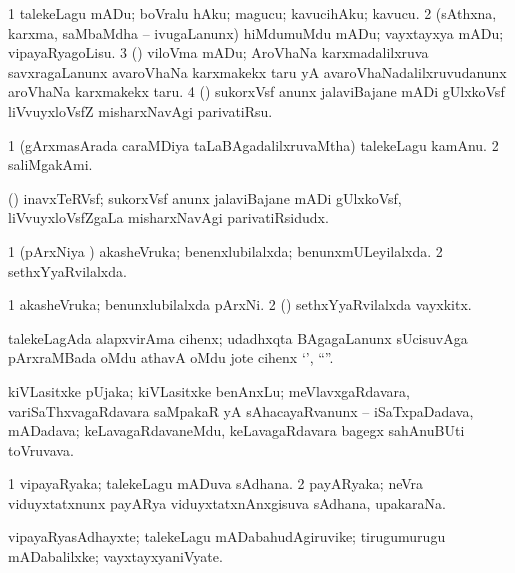 \bentry
{}
\gl{\sakirx}
\bmng
\bnum
\num{1} talekeLagu mADu; boVralu hAku; magucu; kavucihAku; kavucu. 
\num{2} (sAthxna, karxma, saMbaMdha -- ivugaLanunx) hiMdumuMdu mADu; vayxtayxya mADu; vipayaRyagoLisu. 
\num{3} (\saM) viloVma mADu; AroVhaNa karxmadalilxruva savxragaLanunx avaroVhaNa karxmakekx taru yA avaroVhaNadalilxruvudanunx aroVhaNa karxmakekx taru. 
\num{4} (\ravi) sukorxVsf anunx jalaviBajane mADi gUlxkoVsf liVvuyxloVsfZ misharxNavAgi parivatiRsu. 
\enum
\emng
\eentry

\bentry
{}
\gl{\nA}
\bmng
\bnum
\num{1} (gArxmasArada caraMDiya taLaBAgadalilxruvaMtha) talekeLagu kamAnu. 
\num{2} saliMgakAmi. 
\enum
\emng
\eentry

\bentry
{}
\gl{\nA}
\bmng
(\ravi) inavxTeRVsf; sukorxVsf anunx jalaviBajane mADi gUlxkoVsf, liVvuyxloVsfZgaLa misharxNavAgi parivatiRsidudx. 
\emng
\eentry

\bentry
{}
\gl{\gu}
\bmng
\bnum
\num{1} (pArxNiya \vi) akasheVruka; benenxlubilalxda; benunxmULeyilalxda. 
\num{2} sethxYyaRvilalxda. 
\enum
\emng
\eentry

\bentry
{}
\gl{\nA}
\bmng
\bnum
\num{1} akasheVruka; benunxlubilalxda pArxNi. 
\num{2} (\rUpa) sethxYyaRvilalxda vayxkitx. 
\enum
\emng
\eentry

\bentry
{}
\gl{\nA}
\bmng
talekeLagAda alapxvirAma cihenx; udadhxqta BAgagaLanunx sUcisuvAga pArxraMBada oMdu athavA oMdu jote cihenx `\eng{$\ldots$}', ``\eng{$\ldots$}''. 
\emng
\eentry

\bentry
{}
\gl{\nA}
\bmng
kiVLasitxke pUjaka; kiVLasitxke benAnxLu; meVlavxgaRdavara, variSaThxvagaRdavara saMpakaR yA sAhacayaRvanunx -- iSaTxpaDadava, mADadava; keLavagaRdavaneMdu, keLavagaRdavara bagegx sahAnuBUti toVruvava. 
\emng
\eentry

\bentry
{}
\gl{\nA}
\bmng
\bnum
\num{1} vipayaRyaka; talekeLagu mADuva sAdhana. 
\num{2} payARyaka; neVra viduyxtatxnunx payARya viduyxtatxnAnxgisuva sAdhana, upakaraNa. 
\enum
\emng
\eentry

\bentry
{}
\gl{\nA}
\bmng
vipayaRyasAdhayxte; talekeLagu mADabahudAgiruvike; tirugumurugu mADabalilxke; vayxtayxyaniVyate. 
\emng
\eentry

